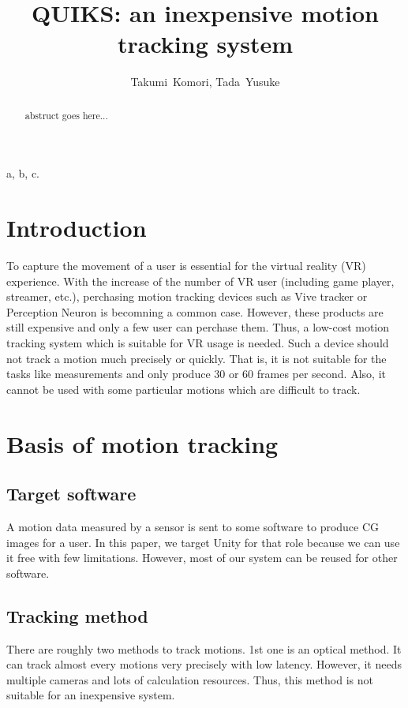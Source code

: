 \documentclass[journal]{IEEEtran}
\begin{document}
\title{QUIKS: an inexpensive motion tracking system}
\author{Takumi~Komori, Tada~Yusuke}
\maketitle
\begin{abstract}
abstruct goes here...
\end{abstract}

\begin{IEEEkeywords}
a, b, c.
\end{IEEEkeywords}

\section{Introduction}
To capture the movement of a user is essential for the virtual reality (VR) experience.
With the increase of the number of VR user (including game player, streamer, etc.), perchasing motion tracking devices such as Vive tracker or Perception Neuron is becomning a common case.
However, these products are still expensive and only a few user can perchase them.
Thus, a low-cost motion tracking system which is suitable for VR usage is needed.
Such a device should not track a motion much precisely or quickly.
That is, it is not suitable for the tasks like measurements and only produce 30 or 60 frames per second.
Also, it cannot be used with some particular motions which are difficult to track.

\section{Basis of motion tracking}
\subsection{Target software}
A motion data measured by a sensor is sent to some software to produce CG images for a user.
In this paper, we target Unity for that role because we can use it free with few limitations.
However, most of our system can be reused for other software.

\subsection{Tracking method}
There are roughly two methods to track motions.
1st one is an optical method.
It can track almost every motions very precisely with low latency.
However, it needs multiple cameras and lots of calculation resources.
Thus, this method is not suitable for an inexpensive system.
\end{document}
